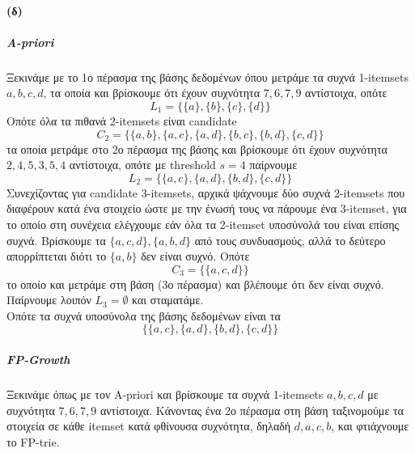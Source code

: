 \documentclass[a4paper,11pt]{article}
\begin{document}
\paragraph{(δ)}
\subparagraph{Α-priori}
Ξεκινάμε με το 1ο πέρασμα της βάσης δεδομένων όπου μετράμε τα συχνά 1-itemsets $a,b,c,d$, τα οποία και βρίσκουμε ότι έχουν συχνότητα $7,6,7,9$ αντίστοιχα, οπότε
\[ L_1 = \{ \{a\},\{b\},\{c\},\{d\} \} \]
Οπότε όλα τα πιθανά 2-itemsets είναι candidate
\[ C_2 = \{ \{a,b\},\{a,c\},\{a,d\},\{b,c\},\{b,d\},\{c,d\} \} \]
τα οποία μετράμε στο 2ο πέρασμα της βάσης και βρίσκουμε ότι έχουν συχνότητα $2,4,5,3,5,4$ αντίστοιχα, οπότε με threshold $s=4$ παίρνουμε
\[ L_2 = \{ \{a,c\},\{a,d\},\{b,d\},\{c,d\} \} \]
Συνεχίζοντας για candidate 3-itemsets, αρχικά ψάχνουμε δύο συχνά 2-itemsets που διαφέρουν κατά ένα στοιχείο ώστε με την ένωσή τους να πάρουμε ένα 3-itemset, για το οποίο στη συνέχεια ελέγχουμε εάν όλα τα 2-itemset υποσύνολά του είναι επίσης συχνά.
Βρίσκουμε τα $\{a,c,d\},\{a,b,d\}$ από τους συνδυασμούς, αλλά το δεύτερο απορρίπτεται διότι το $\{a,b\}$ δεν είναι συχνό.
Οπότε
\[ C_3 = \{ \{a,c,d\} \} \]
το οποίο και μετράμε στη βάση (3ο πέρασμα) και βλέπουμε ότι δεν είναι συχνό.
Παίρνουμε λοιπόν $L_3 = \emptyset$ και σταματάμε.
\\[8pt]
Οπότε τα συχνά υποσύνολα της βάσης δεδομένων είναι τα
\[ \{ \{a,c\},\{a,d\},\{b,d\},\{c,d\} \} \]

\subparagraph{FP-Growth}
Ξεκινάμε όπως με τον A-priori και βρίσκουμε τα συχνά 1-itemsets $a,b,c,d$ με συχνότητα $7,6,7,9$ αντίστοιχα.
Κάνοντας ένα 2ο πέρασμα στη βάση ταξινομούμε τα στοιχεία σε κάθε itemset κατά φθίνουσα συχνότητα, δηλαδή $d,a,c,b$, και φτιάχνουμε το FP-trie.
\begin{center}
\end{center}
\end{document}
